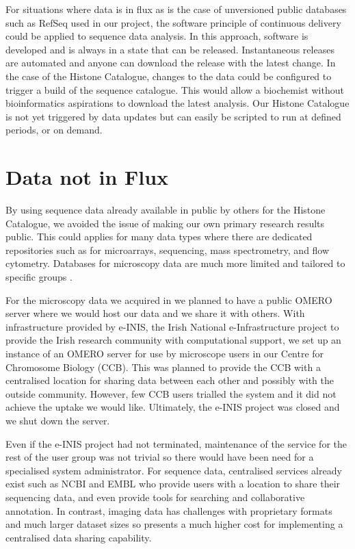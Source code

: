 For situations where data is in
flux as is the case of unversioned public databases such as RefSeq
used in our project, the software
principle of continuous delivery could be applied to sequence data
analysis.  In this approach,
software is developed and is always in a state that can be
released.  Instantaneous releases are automated and anyone can download the
release with the latest change.  In the case of the Histone Catalogue,
changes to the data could be configured to
trigger a build of the sequence catalogue.  This would allow a biochemist
without bioinformatics aspirations to download the latest analysis.
Our Histone Catalogue is not yet triggered by data updates but can
easily be
scripted to run at defined periods, or on demand.

\section{Data not in Flux}

By using sequence data already available in public by others for the
Histone Catalogue,
we avoided the issue
of making our own primary research results public.  This could applies
for many data types where there are dedicated repositories such as for
microarrays, sequencing, mass spectrometry, and flow cytometry.
Databases for microscopy data are much more limited and tailored to
specific groups .

For the microscopy data we acquired in  we planned
to have a public OMERO server where we would host our data and we
share it with others.  With infrastructure provided by
e-INIS, the Irish National e-Infrastructure project to provide the
Irish research community with computational support,
we set up an instance of an OMERO server for use by
microscope users in our Centre for Chromosome Biology (CCB).
This was planned to provide the CCB
with a centralised location for sharing data between each
other and possibly with the outside community.  However, few CCB users
trialled the system and it did not achieve the uptake we would like.
Ultimately, the e-INIS project was closed and we
shut down the server.

Even if the e-INIS project had not terminated, maintenance of the service
for the rest of the user group was not trivial so there would have been need
for a specialised system administrator.  For sequence data,
centralised services already exist such as
NCBI and EMBL who provide users with a
location to share their sequencing data, and even provide tools for
searching and collaborative annotation.  In contrast, imaging data
has challenges with proprietary formats and much larger dataset sizes
so presents a much higher cost for implementing a centralised data
sharing capability.


